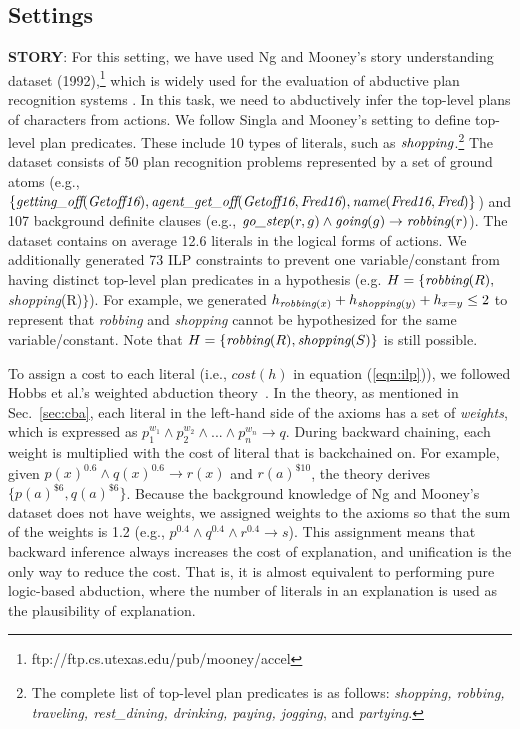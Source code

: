 \documentclass[english]{jnlp_1.4}
\begin{document}
\subsection{Settings}
\label{sec:setting}

\textbf{STORY}: For this setting, we have used Ng and Mooney\nocite{Ng92}'s story understanding
dataset (1992),\footnote{ftp://ftp.cs.utexas.edu/pub/mooney/accel} which is
widely used for the evaluation of abductive plan recognition systems
\cite{Kate09,Raghavan10,Singla11}. In this task, we need to
abductively infer the top-level plans of characters from actions. We
follow Singla and Mooney\nocite{Singla11}'s setting to define
top-level plan predicates. These include 10
types of literals, such as $\emph{shopping}$.\footnote{The complete
  list of top-level plan predicates is as follows: \emph{shopping, robbing,
  traveling, rest\_dining, drinking, paying, jogging}, and \emph{partying}.} 
  The dataset consists of 50 plan recognition problems represented by a set of
ground atoms (e.g., {\small $\{ \emph{getting\_off}(\emph{Getoff16}),
  \emph{agent\_get\_off}(\emph{Getoff16},\emph{Fred16}),
  \emph{name}(\emph{Fred16},\emph{Fred})\}$}) and 107 background
definite clauses (e.g.,  {\small $\emph{go\_step}(r,g) \land
  \emph{going}(g) \rightarrow \emph{robbing}(r)$}). The dataset
contains on average 12.6 literals in the logical forms of actions. 
We additionally generated 73 ILP constraints to prevent one variable/constant
from having distinct top-level plan predicates in a hypothesis (e.g.
$H=\{\emph{robbing}(R), $\emph{shopping}(R)$\}$).
 For example, we generated $h_{\emph{robbing}(x)} + h_{\emph{shopping}(y)} + h_{x=y} \leq 2$
to represent that \emph{robbing} and \emph{shopping} cannot be hypothesized for
the same variable/constant. Note that $H = \{\emph{robbing}(R),
\emph{shopping}(S)\}$ is still possible.

To assign a cost to each literal (i.e., $cost(h)$ in equation
(\ref{eqn:ilp})), we followed Hobbs et al.\nocite{Hobbs93}'s
weighted abduction theory~\cite{Hobbs93}. In the theory, as mentioned in
Sec.~\ref{sec:cba}, each literal in the left-hand side of the axioms has a
set of \emph{weights}, which is expressed as $p_1^{w_1} \land
p_2^{w_2} \land ... \land p_n^{w_n} \rightarrow q$. During
backward chaining, each weight is multiplied with the cost of literal
that is backchained on. For example, given $p(x)^{0.6} \land
q(x)^{0.6} \rightarrow r(x)$ and $r(a)^{\$10}$, the theory derives
$\{p(a)^{\$6}, q(a)^{\$6}\}$. Because the background knowledge of Ng
and Mooney's dataset does not have weights, we assigned
weights to the axioms so that the sum of the weights is 1.2 (e.g., $p^{0.4}
\land q^{0.4} \land r^{0.4} \rightarrow s$). This assignment means
that backward inference always increases the cost of explanation, and
unification is the only way to reduce the cost. That is, it is almost
equivalent to performing pure logic-based abduction, where the number
of literals in an explanation is used as the plausibility of
explanation.
\end{document}
